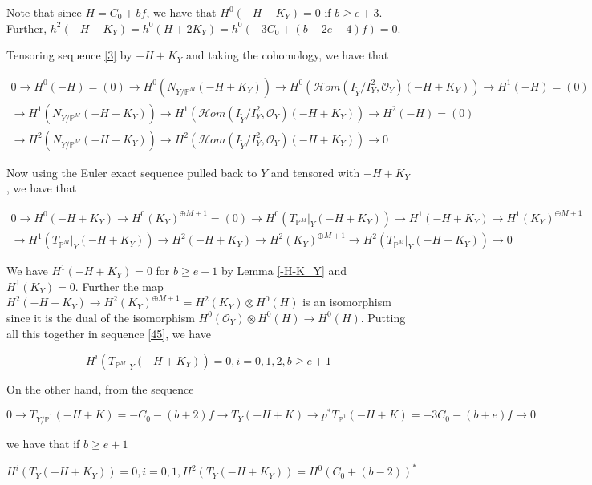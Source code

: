 \documentclass[11pt,twoside]{amsart}
\theoremstyle{plain}
\numberwithin{equation}{section}
\theoremstyle{definition}
\begin{document}
Note that since $H = C_0+bf$, we have that $H^0(-H-K_Y) = 0$ if $b \geq e+3$. Further, $h^2(-H-K_Y) = h^0(H+2K_Y) = h^0(-3C_0+(b-2e-4)f) = 0$.

Tensoring sequence \ref{3} by $-H+K_Y$ and taking the cohomology, we have that 

\begin{multline}\label{44}
 0 \to H^0(-H) = (0) \to H^0(N_{Y/\mathbb{P}^M}(-H+K_Y)) \to H^0(\mathcal{H}om(I_{\widetilde{Y}}/I_{Y}^2, \mathcal{O}_Y)(-H+K_Y)) \to H^1(-H) = (0) \\ \to H^1(N_{Y/\mathbb{P}^M}(-H+K_Y)) \to H^1(\mathcal{H}om(I_{\widetilde{Y}}/I_{Y}^2, \mathcal{O}_Y)(-H+K_Y)) \to H^2(-H) = (0) \\ \to
 H^2(N_{Y/\mathbb{P}^M}(-H+K_Y)) \to H^2(\mathcal{H}om(I_{\widetilde{Y}}/I_{Y}^2, \mathcal{O}_Y)(-H+K_Y)) \to 0
\end{multline}

Now using the Euler exact sequence pulled back to $Y$  and tensored with $-H+K_Y$, we have that 

\begin{multline}\label{45}
 0 \to H^0(-H+K_Y) \to H^0(K_Y)^{\oplus M+1} = (0) \to H^0(T_{\mathbb{P}^M}|_Y (-H+K_Y)) \to H^1(-H+K_Y) \to H^1(K_Y)^{\oplus M+1} \\ \to H^1(T_{\mathbb{P}^M}|_Y (-H+K_Y)) \to H^2(-H+K_Y) \to H^2(K_Y)^{\oplus M+1} \to H^2(T_{\mathbb{P}^M}|_Y (-H+K_Y)) \to 0   
\end{multline}

We have $H^1(-H+K_Y) = 0$ for $b \geq e+1$ by Lemma \ref{-H-K_Y} and $H^1(K_Y) = 0$. Further the map $H^2(-H+K_Y) \to H^2(K_Y)^{\oplus M+1} = H^2(K_Y) \otimes H^0(H)$ is an isomorphism since it is the dual of the isomorphism $H^0(\mathcal{O}_Y) \otimes H^0(H) \to H^0(H)$. Putting all this together in sequence \ref{45}, we have

\begin{equation}\label{46}
  H^i(T_{\mathbb{P}^M}|_Y (-H+K_Y)) = 0, i = 0,1,2, b \geq e+1
\end{equation}

On the other hand, from the sequence 

\begin{equation}
    0 \to T_{Y/\mathbb{P}^1}(-H+K) = -C_0-(b+2)f \to T_Y(-H+K) \to p^*T_{\mathbb{P}^1}(-H+K) = -3C_0-(b+e)f \to 0
\end{equation}

we have that if $b \geq e+1$

\begin{equation}\label{47}
    H^{i}(T_Y(-H+K_Y)) = 0, i = 0,1, H^2(T_Y(-H+K_Y)) = H^0(C_0+(b-2))^*
\end{equation}
\end{document}

